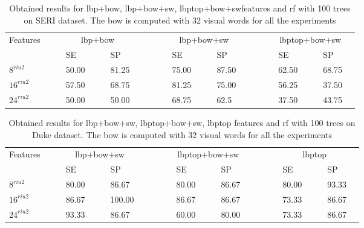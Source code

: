 \begin{table}
\caption{Obtained results for \ac{lbp}+\ac{bow}, \ac{lbp}+\ac{bow}+\ac{sw}, \ac{lbptop}+\ac{bow}+\ac{sw}features and \ac{rf} with 100 trees on SERI dataset. The \ac{bow} is computed with 32 visual words for all the experiments}
\centering
\begin{tabular}{lcclcclcccclcclcccclcclc}
\toprule
Features 	& & &\multicolumn{4}{c}{\ac{lbp}+\ac{bow}}&	 & & & &\multicolumn{4}{c}{\ac{lbp}+\ac{bow}+\ac{sw}}& & & & &\multicolumn{4}{c}{\ac{lbptop}+\ac{bow}+\ac{sw}} &\\
  \cmidrule(l){2-8}  \cmidrule(l){10-16}  \cmidrule(l){18-24}
	       & & & SE & & & SP & & & & & SE & & & SP & & & & & SE & & & SP & \\
\midrule
 $8^{riu2}$ 						& & & 50.00 & & & 81.25 & & & & & 75.00 & & & 87.50 & & & & & 62.50 & & & 68.75 & \\	
 $16^{riu2}$						& & & 57.50 & & & 68.75 & & & & & 81.25 & & & 75.00 & & & & & 56.25 & & & 37.50 & \\	
 $24^{riu2}$						& & & 50.00 & & & 50.00 & & & & & 68.75 & & & 62.5 & & & & & 37.50 & & & 43.75 & \\
\bottomrule
\end{tabular}
\label{tab:SERIBoWResult}
\end{table}


\begin{table}
\caption{Obtained results for \ac{lbp}+\ac{bow}+\ac{sw}, \ac{lbptop}+\ac{bow}+\ac{sw}, \ac{lbptop} features and \ac{rf} with 100 trees on Duke dataset. The \ac{bow} is computed with 32 visual words for all the experiments}
\centering
\begin{tabular}{lcclcclcccclcclcccclcclc}
\toprule
Features 	& & &\multicolumn{4}{c}{\ac{lbp}+\ac{bow}+\ac{sw}}&	 & & & &\multicolumn{4}{c}{\ac{lbptop}+\ac{bow}+\ac{sw}} & & & & &\multicolumn{4}{c}{\ac{lbptop}} &\\
  \cmidrule(l){2-8}  \cmidrule(l){10-16}  \cmidrule(l){18-24}
	         & & & SE & & & SP & & & & & SE & & & SP & & & & & SE & & & SP & \\
\midrule
 $8^{riu2}$ 						& & & 80.00 & & & 86.67 & & & & & 80.00 & & & 86.67 & & & & & 80.00 & & & 93.33 &\\	
 $16^{riu2}$						& & & 86.67 & & & 100.00 & & & & & 86.67 & & & 86.67 & & & & & 73.33 & & & 86.67 & \\	
 $24^{riu2}$						& & & 93.33 & & & 86.67 & & & & & 60.00 & & & 80.00 & & & & & 73.33 & & & 86.67 & \\
\bottomrule
\end{tabular}
\label{tab:DukeBoWResult}
\end{table}



